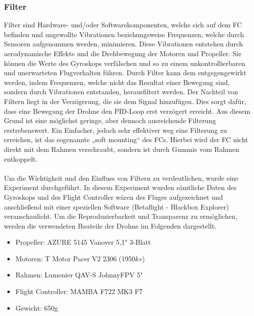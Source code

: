         \subsubsection[Filter]{Filter}
        Filter sind Hardware- und/oder Softwarekomponenten, welche sich auf dem FC befinden und
        ungewollte Vibrationen beziehungsweise Frequenzen, welche durch Sensoren aufgenommen werden,
        minimieren. Diese Vibrationen entstehen durch aerodynamische Effekte und die Drehbewegung
        der Motoren und Propeller. Sie können die Werte des Gyroskops verfälschen und so zu einem
        unkontrollierbaren und unerwarteten Flugverhalten führen. Durch Filter kann dem entgegengewirkt
        werden, indem Frequenzen, welche nicht das Resultat einer Bewegung sind, sondern durch Vibrationen
        entstanden, herausfiltert werden. Der Nachteil von Filtern liegt in der Verzögerung, die sie
        dem Signal hinzufügen. Dies sorgt dafür, dass eine Bewegung der Drohne den PID-Loop erst verzögert
        erreicht. Aus diesem Grund ist eine möglichst geringe, aber dennoch ausreichende Filterung
        erstrebenswert. Ein Einfacher, jedoch sehr effektiver weg eine Filterung zu erreichen, ist das
        sogenannte „soft mounting“ des FCs. Hierbei wird der FC nicht direkt mit dem Rahmen verschraubt,
        sondern ist durch Gummis vom Rahmen entkoppelt. \\
        \\
        Um die Wichtigkeit und den Einfluss von Filtern zu verdeutlichen, wurde eine Experiment durchgeführt.
        In diesem Experiment wurden sämtliche Daten des Gyroskops und des Flight Controller wären des Fluges
        aufgezeichnet und anschließend mit einer speziellen Software (Betaflight - Blackbox Explorer)
        veranschaulicht. Um die Reproduzierbarkeit und Transparenz zu ermöglichen, werden die verwendeten
        Bauteile der Drohne im Folgenden dargestellt. \\

        \begin{itemize}
            \item[] Propeller: AZURE 5145 Vanover 5,1" 3-Blatt
            \item[] Motoren: T Motor Pacer V2 2306 (1950$kv$)
            \item[] Rahmen: Lumenier QAV-S JohnnyFPV 5"
            \item[] Flight Controller: MAMBA F722 MK3 F7
            \item[] Gewicht: 650g
        \end{itemize}
       

